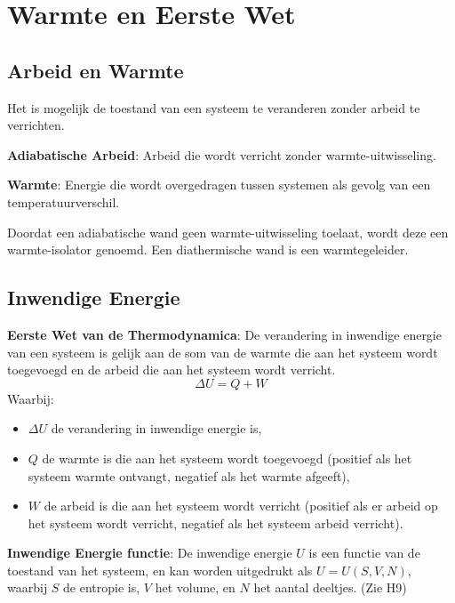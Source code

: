 \section{Warmte en Eerste Wet}
\subsection{Arbeid en Warmte}
Het is mogelijk de toestand van een systeem te veranderen zonder arbeid te verrichten. 

\begin{definition}
    \textbf{Adiabatische Arbeid}: Arbeid die wordt verricht zonder warmte-uitwisseling.
\end{definition}
\begin{definition}
    \textbf{Warmte}: Energie die wordt overgedragen tussen systemen als gevolg van een temperatuurverschil.
\end{definition}

Doordat een adiabatische wand geen warmte-uitwisseling toelaat, wordt deze een warmte-isolator genoemd. Een diathermische wand is een warmtegeleider.

\subsection{Inwendige Energie}

\begin{postulate}
    \textbf{Eerste Wet van de Thermodynamica}: De verandering in inwendige energie van een systeem is gelijk aan de som van de warmte die aan het systeem wordt toegevoegd en de arbeid die aan het systeem wordt verricht.
    \begin{equation}
        \Delta U = Q + W
    \end{equation}
    Waarbij:
    \begin{itemize}
        \item $\Delta U$ de verandering in inwendige energie is,
        \item $Q$ de warmte is die aan het systeem wordt toegevoegd (positief als het systeem warmte ontvangt, negatief als het warmte afgeeft),
        \item $W$ de arbeid is die aan het systeem wordt verricht (positief als er arbeid op het systeem wordt verricht, negatief als het systeem arbeid verricht).
    \end{itemize}   
\end{postulate}

\begin{definition}
    \textbf{Inwendige Energie functie}: De inwendige energie $U$ is een functie van de toestand van het systeem, en kan worden uitgedrukt als $U = U(S, V, N)$, waarbij $S$ de entropie is, $V$ het volume, en $N$ het aantal deeltjes.
    (Zie H9)
\end{definition}


